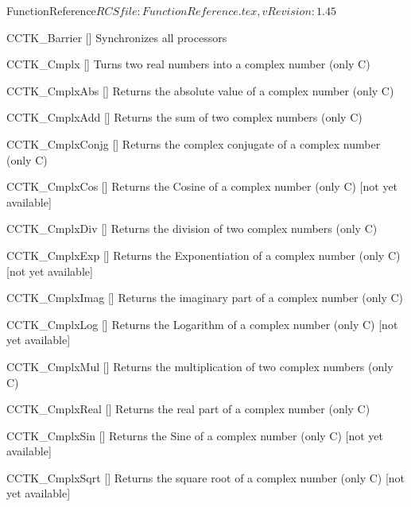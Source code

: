 \begin{cactuspart}{5}{FunctionReference}{$RCSfile: FunctionReference.tex,v $}{$Revision: 1.45 $}
\begin{Lentry}
\item[CCTK\_Barrier]
  [\pageref{CCTK-Barrier}]
  Synchronizes all processors

\item[CCTK\_Cmplx]
  [\pageref{CCTK-Cmplx}]
  Turns two real numbers into a complex number (only C)

\item[CCTK\_CmplxAbs]
  [\pageref{CCTK-CmplxAbs}]
  Returns the absolute value of a complex number (only C)

\item[CCTK\_CmplxAdd]
  [\pageref{CCTK-CmplxAdd}]
  Returns the sum of two complex numbers (only C)

\item[CCTK\_CmplxConjg]
  [\pageref{CCTK-CmplxConjg}]
  Returns the complex conjugate of a complex number (only C)

\item[CCTK\_CmplxCos]
  [\pageref{CCTK-CmplxCos}]
  Returns the Cosine of a complex number (only C) [not yet available]

\item[CCTK\_CmplxDiv]
  [\pageref{CCTK-CmplxDiv}]
  Returns the division of two complex numbers (only C)

\item[CCTK\_CmplxExp]
  [\pageref{CCTK-CmplxExp}]
  Returns the Exponentiation of a complex number (only C) [not yet available]

\item[CCTK\_CmplxImag]
  [\pageref{CCTK-CmplxImag}]
  Returns the imaginary part of a complex number (only C)

\item[CCTK\_CmplxLog]
  [\pageref{CCTK-CmplxLog}]
  Returns the Logarithm of a complex number (only C) [not yet available]

\item[CCTK\_CmplxMul]
  [\pageref{CCTK-CmplxMul}]
  Returns the multiplication of two complex numbers (only C)

\item[CCTK\_CmplxReal]
  [\pageref{CCTK-CmplxReal}]
  Returns the real part of a complex number (only C)

\item[CCTK\_CmplxSin]
  [\pageref{CCTK-CmplxSin}]
  Returns the Sine of a complex number (only C) [not yet available]

\item[CCTK\_CmplxSqrt]
  [\pageref{CCTK-CmplxSqrt}]
  Returns the square root of a complex number (only C) [not yet available]


\end{Lentry}
\end{cactuspart}
